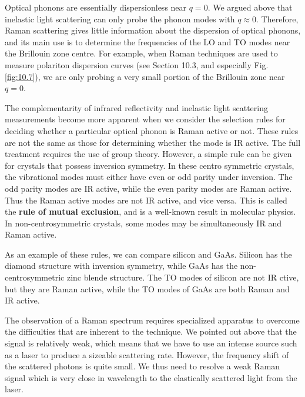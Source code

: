\documentclass[12pt]{book}
\begin{document}
{Optical phonons are essentially dispersionless near $q = 0$. We argued above that inelastic light scattering can only probe the phonon modes with $q\approx0$. Therefore, Raman scattering gives little information about the dispersion of optical phonons, and its main use is to determine the frequencies of the LO and TO modes near the Brillouin zone centre. For example, when Raman techniques are used to measure polariton dispersion curves (see Section 10.3, and especially Fig. \ref{fig:10.7}), we are only probing a very small portion of the Brillouin zone near $q = 0$.

The complementarity of infrared reflectivity and inelastic light scattering measurements become more apparent when we consider the selection rules for deciding whether a particular optical phonon is Raman active or not. These rules are not the same as those for determining whether the mode is IR active. The full treatment requires the use of group theory. However, a simple rule can be given for crystals that possess inversion symmetry. In these centro symmetric crystals, the vibrational modes must either have even or odd parity under inversion. The odd parity modes are IR active, while the even parity modes are Raman active. Thus the Raman active modes are not IR active, and vice versa. This is called the \textbf{rule of mutual exclusion}, and is a well-known result in molecular physics. In non-centrosymmetric crystals, some modes may be simultaneously IR and Raman active.

As an example of these rules, we can compare silicon and GaAs. Silicon has the diamond structure with inversion symmetry, while GaAs has the non-centrosymmetric zinc blende structure. The TO modes of silicon are not IR ctive, but they are Raman active, while the TO modes of GaAs are both Raman and IR active.

The observation of a Raman spectrum requires specialized apparatus to overcome the difficulties that are inherent to the technique. We pointed out above that the signal is relatively weak, which means that we have to use an intense source such as a laser to produce a sizeable scattering rate. However, the frequency shift of the scattered photons is quite small. We thus need to resolve a weak Raman signal which is very close in wavelength to the elastically scattered light from the laser.

}
\end{document}
